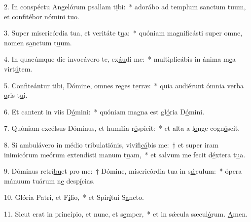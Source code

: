 2. In conspéctu Angelórum psallam t\uline{i}bi:~* adorábo ad templum sanctum tuum, et confitébor n\uline{ó}mini t\uline{u}o.\par 
3. Super misericórdia tua, et veritáte t\uline{u}a:~* quóniam magnificásti super omne, nomen s\uline{a}nctum t\uline{u}um.\par 
4. In quacúmque die invocávero te, ex\uline{áu}di me:~* multiplicábis in ánima m\uline{e}a virt\uline{ú}tem.\par 
5. Confiteántur tibi, Dómine, omnes reges t\uline{e}rræ:~* quia audiérunt ómnia verba \uline{o}ris t\uline{u}i.\par 
6. Et cantent in viis D\uline{ó}mini:~* quóniam magna est gl\uline{ó}ria D\uline{ó}mini.\par 
7. Quóniam excélsus Dóminus, et humília r\uline{é}spicit:~* et alta a l\uline{o}nge cogn\uline{ó}scit.\par 
8. Si ambulávero in médio tribulatiónis, vivifi\uline{cá}bis me:~† et super iram inimicórum meórum extendísti manum t\uline{u}am,~* et salvum me fecit d\uline{é}xtera t\uline{u}a.\par 
9. Dóminus retrí\uline{bu}et pro me:~† Dómine, misericórdia tua in s\uline{ǽ}culum:~* ópera mánuum tuárum n\uline{e} desp\uline{í}cias.\par 
10. Glória Patri, et F\uline{í}lio,~* et Spir\uline{í}tui S\uline{a}ncto.\par 
11. Sicut erat in princípio, et nunc, et s\uline{e}mper,~* et in sǽcula sæcul\uline{ó}rum. \uline{A}men.\par 
